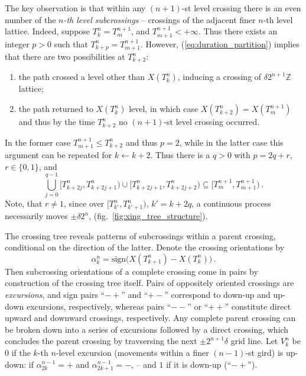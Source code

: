 \documentclass[a4paper]{article}
\begin{document}
The key observation is that within any $(n+1)$-st level crossing there is an even
number of the \emph{$n$-th level subcrossings} -- crossings of the adjacent finer
$n$-th level lattice. Indeed, suppose $T_k^n = T_m^{n+1}$, and $T_{m+1}^{n+1} < +\infty$.
Thus there exists an integer $p > 0$ such that $T_{k+p}^n = T_{m+1}^{n+1}$. However,
(\ref{eq:duration_partition}) implies that there are two possibilities at $T_{k+2}^n$:
\begin{enumerate}
    \item the path crossed a level other than $X(T_k^n)$, inducing a crossing of
    $\delta 2^{n+1}\mathbb{Z}$ lattice;
    \item the path returned to $X(T_k^n)$ level, in which case $X(T_{k+2}^n) = X(T_m^{n+1})$
    and thus by the time $T_{k+2}^n$ no $(n+1)$-st level crossing occurred.
\end{enumerate}
In the former case $T_{m+1}^{n+1} \leq T_{k+2}^n$ and thus $p=2$, while in the latter
case this argument can be repeated for $k \leftarrow k+2$. Thus there is a $q > 0$
with $p = 2q + r$, $r \in \{0, 1\}$, and
\begin{equation*} %
    \bigcup_{j=0}^{q-1} \bigl[T_{k+2j}^n, T_{k+2j+1}^n\bigr)
                   \cup \bigl[T_{k+2j+1}^n, T_{k+2j+2}^n\bigr)
        \subseteq \bigl[T_m^{n+1}, T_{m+1}^{n+1}\bigr) \,.
\end{equation*}
Note, that $r\neq 1$, since over $\bigl[T_{k'}^n, T_{k'+1}^n\bigr)$, $k' = k + 2q$,
a continuous process necessarily moves $\pm \delta 2^n$, (fig.~\ref{fig:xing_tree_structure}).

The crossing tree reveals patterns of subcrossings within a parent crossing,
conditional on the direction of the latter. Denote the crossing orientations by
\[ \alpha_k^n = \text{sign}\bigl( X(T_{k+1}^n) - X(T_k^n)\bigr)
    \,. \]
Then subcrossing orientations of a complete crossing come in pairs by construction
of the crossing tree itself. Pairs of oppositely oriented crossings are
\emph{excursions}, and sign pairs ``$-+$'' and ``$+-$'' correspond to down-up
and up-down excursions, respectively, whereas pairs ``$--$'' or ``$++$'' constitute
direct upward and downward crossings, respectively. Any complete parent crossing
can be broken down into a series of excursions followed by a direct crossing, which
concludes the parent crossing by travsersing the next $\pm2^{n+1} \delta$ grid line.
Let $V_k^n$ be $0$ if the $k$-th $n$-level excursion (movements within a finer $(n-1)$-st
gird) is up-down: if $\alpha_{2k}^{n-1} = +$ and $\alpha_{2k+1}^{n-1} = -$, --
and $1$ if it is down-up (``$-+$'').
\end{document}
